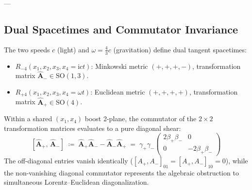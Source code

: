 \documentclass[
    12pt,
    a4paper,
    headings=normal,
    twoside=false,
    open=any,
    parskip=half
]{scrbook}
\newcommand{\iu}{\mathrm{i}}
\begin{document}
---

\subsection{Dual Spacetimes and Commutator Invariance}

The two speeds $c$ (light) and $\omega = \frac{4}{3}c$ (gravitation) define dual tangent spacetimes:
\begin{itemize}[noitemsep]
    \item $R_{-4}(x_1, x_2, x_3, x_4 = \iu c t)$: Minkowski metric $(+,+,+,-)$, transformation matrix $\hat{\mathbf{A}}_- \in \mathrm{SO}(1,3)$.
    \item $R_{+4}(x_1, x_2, x_3, x_4 = \omega t)$: Euclidean metric $(+,+,+,+)$, transformation matrix $\hat{\mathbf{A}}_+ \in \mathrm{SO}(4)$.
\end{itemize}

\begin{phystheorem}\label{thm:ch1_dual_boost_commutator}
Within a shared $(x_1, x_4)$ boost 2-plane, the commutator of the $2 \times 2$ transformation matrices evaluates to a pure diagonal shear:
\begin{equation}
\boxed{[\hat{\mathbf{A}}_+, \, \hat{\mathbf{A}}_-] \;\coloneqq\; \hat{\mathbf{A}}_+ \hat{\mathbf{A}}_- - \hat{\mathbf{A}}_- \hat{\mathbf{A}}_+ \;=\; \gamma_+ \gamma_- \begin{pmatrix} 2\beta_+ \beta_- & 0 \\ 0 & -2\beta_+ \beta_- \end{pmatrix}}
\label{eq:ch1_dual_boost_commutator_master}
\end{equation}
The off-diagonal entries vanish identically ($[A_+, A_-]_{01} = [A_+, A_-]_{10} = 0$), while the non-vanishing diagonal commutator represents the algebraic obstruction to simultaneous Lorentz--Euclidean diagonalization.
\end{phystheorem}
\end{document}
